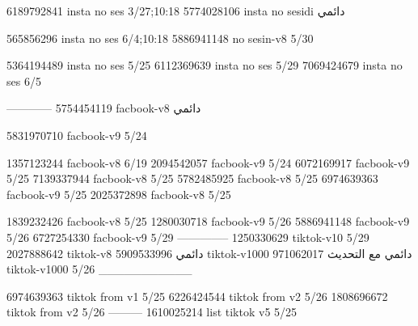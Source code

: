 
6189792841 insta no ses
3/27;10:18
5774028106 insta no sesidi
دائمي


565856296 insta no ses
6/4;10:18
5886941148 no sesin-v8
5/30

5364194489 insta no ses
5/25
6112369639 insta no ses
5/29
7069424679 insta no ses
6/5

------------
5754454119 facbook-v8
دائمي

5831970710 facbook-v9
5/24

1357123244 facbook-v8
6/19
2094542057 facbook-v9
5/24
6072169917 facbook-v9
5/25
7139337944 facbook-v8
5/25
5782485925 facbook-v8
5/25
6974639363 facbook-v9
5/25
2025372898 facbook-v8
5/25

1839232426 facbook-v8
5/25
1280030718 facbook-v9
5/26
5886941148 facbook-v9
5/26
6727254330 facbook-v9
5/29
--------------
1250330629 tiktok-v10
5/29
2027888642 tiktok-v8
دائمي
5909533996 tiktok-v1000
دائمي مع التحديث
971062017 tiktok-v1000
5/26
___________

6974639363 tiktok from v1
5/25
6226424544 tiktok from v2
5/26
1808696672 tiktok from v2
5/26
---------
1610025214 list tiktok v5
5/25
